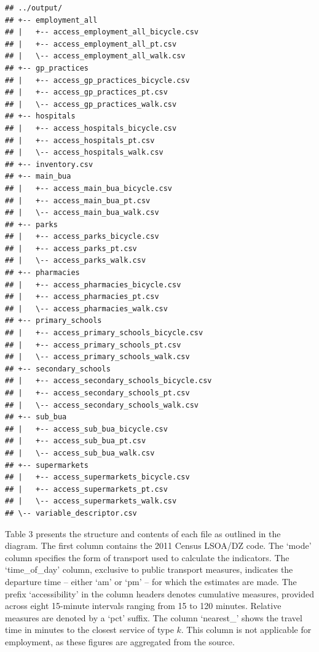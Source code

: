 \documentclass{article}
\begin{document}
\begin{verbatim}
## ../output/
## +-- employment_all
## |   +-- access_employment_all_bicycle.csv
## |   +-- access_employment_all_pt.csv
## |   \-- access_employment_all_walk.csv
## +-- gp_practices
## |   +-- access_gp_practices_bicycle.csv
## |   +-- access_gp_practices_pt.csv
## |   \-- access_gp_practices_walk.csv
## +-- hospitals
## |   +-- access_hospitals_bicycle.csv
## |   +-- access_hospitals_pt.csv
## |   \-- access_hospitals_walk.csv
## +-- inventory.csv
## +-- main_bua
## |   +-- access_main_bua_bicycle.csv
## |   +-- access_main_bua_pt.csv
## |   \-- access_main_bua_walk.csv
## +-- parks
## |   +-- access_parks_bicycle.csv
## |   +-- access_parks_pt.csv
## |   \-- access_parks_walk.csv
## +-- pharmacies
## |   +-- access_pharmacies_bicycle.csv
## |   +-- access_pharmacies_pt.csv
## |   \-- access_pharmacies_walk.csv
## +-- primary_schools
## |   +-- access_primary_schools_bicycle.csv
## |   +-- access_primary_schools_pt.csv
## |   \-- access_primary_schools_walk.csv
## +-- secondary_schools
## |   +-- access_secondary_schools_bicycle.csv
## |   +-- access_secondary_schools_pt.csv
## |   \-- access_secondary_schools_walk.csv
## +-- sub_bua
## |   +-- access_sub_bua_bicycle.csv
## |   +-- access_sub_bua_pt.csv
## |   \-- access_sub_bua_walk.csv
## +-- supermarkets
## |   +-- access_supermarkets_bicycle.csv
## |   +-- access_supermarkets_pt.csv
## |   \-- access_supermarkets_walk.csv
## \-- variable_descriptor.csv
\end{verbatim}

Table 3 presents the structure and contents of each file as outlined in
the diagram. The first column contains the 2011 Census LSOA/DZ code. The
`mode' column specifies the form of transport used to calculate the
indicators. The `time\_of\_day' column, exclusive to public transport
measures, indicates the departure time -- either `am' or `pm' -- for
which the estimates are made. The prefix `accessibility' in the column
headers denotes cumulative measures, provided across eight 15-minute
intervals ranging from 15 to 120 minutes. Relative measures are denoted
by a `pct' suffix. The column `nearest\_' shows the travel time in
minutes to the closest service of type \(k\). This column is not
applicable for employment, as these figures are aggregated from the
source.
\end{document}
